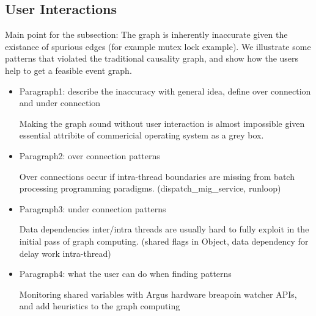 \subsection{User Interactions}

Main point for the subsection: The graph is inherently inaccurate given the
existance of spurious edges (for example mutex lock example). We illustrate some
patterns that violated the traditional causality graph, and show how the users
help to get a feasible event graph.

\begin{itemize}

 	\item Paragraph1: describe the inaccuracy with general idea, define over
connection and under connection

Making the graph sound without user interaction is almost impossible given
essential attribite of commericial operating system as a grey box.
	
	\item Paragraph2: over connection patterns

Over connections occur if intra-thread boundaries are missing from batch
processing programming paradigms. (dispatch\_mig\_service, runloop)

	\item Paragraph3: under connection patterns

Data dependencies inter/intra threads are usually hard to fully exploit in the
initial pass of graph computing. (shared flags in Object, data dependency for
delay work intra-thread)

	\item Paragraph4: what the user can do when finding patterns

Monitoring shared variables with Argus hardware breapoin watcher APIs, and add
heuristics to the graph computing

\end{itemize}
